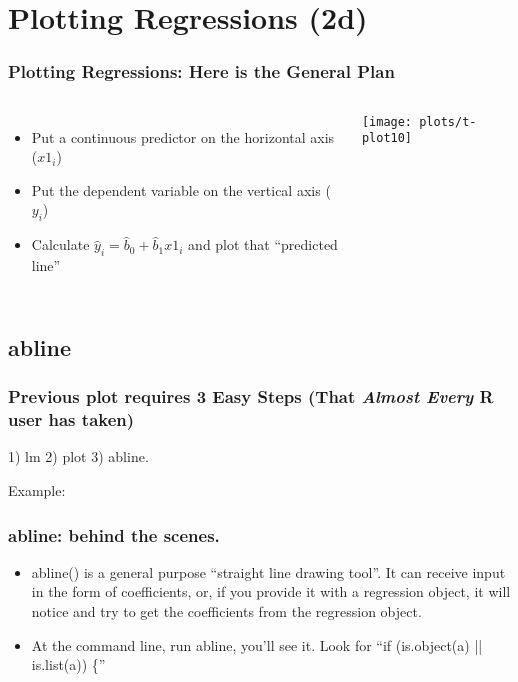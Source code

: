 \documentclass[10pt,english]{beamer}
\def\lyxframeend{} %
\newenvironment{topcolumns}{\begin{columns}[t]}{\end{columns}}
\begin{document}
\lyxframeend{}\section{Plotting Regressions (2d)}

\begin{frame}[containsverbatim]
\frametitle{Plotting Regressions: Here is the General Plan}

\begin{topcolumns}%


\column{5cm}
\begin{itemize}
\item Put a continuous predictor on the horizontal axis ($x1_{i}$)
\item Put the dependent variable on the vertical axis ($y_{i}$)
\item Calculate $\hat{y}_{i}=\hat{b}_{0}+\hat{b}_{1}x1_{i}$ and plot that
``predicted line''
\end{itemize}

\column{7cm}

\texttt{[image: plots/t-plot10]}
\end{topcolumns}%
\end{frame}


\lyxframeend{}\subsection{abline}

\begin{frame}[containsverbatim]
\frametitle{Previous plot requires 3 Easy Steps (That \emph{Almost Every} R user has taken)}

1) lm 2) plot 3) abline.

Example:



\end{frame}

\begin{frame}
\frametitle{abline: behind the scenes.}
\begin{itemize}
\item abline() is a general purpose ``straight line drawing tool''. It
can receive input in the form of coefficients, or, if you provide
it with a regression object, it will notice and try to get the coefficients
from the regression object.
\item At the command line, run abline, you'll see it. Look for ``if (is.object(a)
|| is.list(a)) \{''
\end{itemize}


\end{frame}
\end{document}
